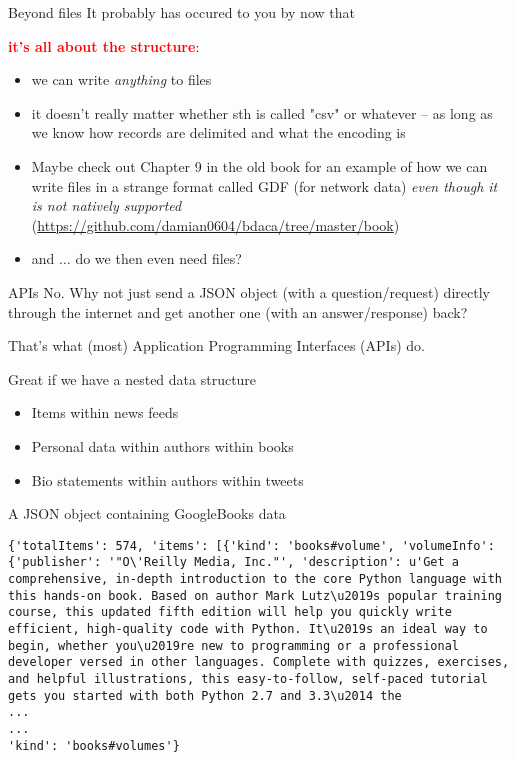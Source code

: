 \documentclass[compress]{beamer}
\begin{document}
\begin{frame}{Beyond files}
It probably has occured to you by now that


\textcolor{red}{\large{\textbf{it's all about the structure}}}:
\begin{itemize}
	\item<2-> we can write \textit{anything} to files
	\item<3-> it doesn't really matter whether sth is called "csv" or whatever -- as long as we know how records are delimited and what the encoding is
	\item<4-> Maybe check out Chapter 9 in the old book for an example of how we can write files in a strange format called GDF (for network data) \emph{even though it is not natively supported} \parencite{Trilling2016} (\url{https://github.com/damian0604/bdaca/tree/master/book})
	\item<5-> and $\ldots$ do we then even need files?
\end{itemize}

\end{frame}

\begin{frame}{APIs}
	{\huge{No.}}
	Why not just send a JSON object (with a question/request) directly through the internet and get another one (with an answer/response) back?
	
	That's what (most) Application Programming Interfaces (APIs) do.
	
	\begin{block}{Great if we have a nested data structure}
		\begin{itemize}
			\item<2-> Items within news feeds
			\item<3-> Personal data within authors within books
			\item<4-> Bio statements within authors within tweets
		\end{itemize}
	\end{block}
\end{frame}


\begin{frame}[fragile]{A JSON object containing GoogleBooks data}
	\begin{lstlisting}
{'totalItems': 574, 'items': [{'kind': 'books#volume', 'volumeInfo': {'publisher': '"O\'Reilly Media, Inc."', 'description': u'Get a comprehensive, in-depth introduction to the core Python language with this hands-on book. Based on author Mark Lutz\u2019s popular training course, this updated fifth edition will help you quickly write efficient, high-quality code with Python. It\u2019s an ideal way to begin, whether you\u2019re new to programming or a professional developer versed in other languages. Complete with quizzes, exercises, and helpful illustrations, this easy-to-follow, self-paced tutorial gets you started with both Python 2.7 and 3.3\u2014 the
...
...
'kind': 'books#volumes'}
	\end{lstlisting}
\end{frame}
\end{document}
